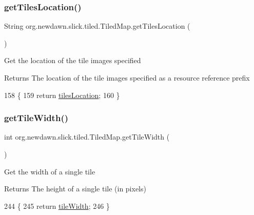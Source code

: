 \subsubsection{\texorpdfstring{get\+Tiles\+Location()}{getTilesLocation()}}
{\footnotesize\ttfamily String org.\+newdawn.\+slick.\+tiled.\+Tiled\+Map.\+get\+Tiles\+Location (\begin{DoxyParamCaption}{ }\end{DoxyParamCaption})\hspace{0.3cm}{\ttfamily [inline]}}

Get the location of the tile images specified

\begin{DoxyReturn}{Returns}
The location of the tile images specified as a resource reference prefix 
\end{DoxyReturn}

\begin{DoxyCode}
158                                      \{
159         \textcolor{keywordflow}{return} \mbox{\hyperlink{classorg_1_1newdawn_1_1slick_1_1tiled_1_1_tiled_map_ad72e470aa9510074aae12dab7968ec1f}{tilesLocation}};
160     \}
\end{DoxyCode}
\mbox{\label{classorg_1_1newdawn_1_1slick_1_1tiled_1_1_tiled_map_a44dd7389139c646e87d056fdd1e44232}} 
\subsubsection{\texorpdfstring{get\+Tile\+Width()}{getTileWidth()}}
{\footnotesize\ttfamily int org.\+newdawn.\+slick.\+tiled.\+Tiled\+Map.\+get\+Tile\+Width (\begin{DoxyParamCaption}{ }\end{DoxyParamCaption})\hspace{0.3cm}{\ttfamily [inline]}}

Get the width of a single tile

\begin{DoxyReturn}{Returns}
The height of a single tile (in pixels) 
\end{DoxyReturn}

\begin{DoxyCode}
244                               \{
245         \textcolor{keywordflow}{return} \mbox{\hyperlink{classorg_1_1newdawn_1_1slick_1_1tiled_1_1_tiled_map_a35bfb6f4f23b344d4ad3f9bda198093e}{tileWidth}};
246     \}
\end{DoxyCode}
\mbox{\label{classorg_1_1newdawn_1_1slick_1_1tiled_1_1_tiled_map_a1a8a716864f741b9f788138407108eb3}} 
